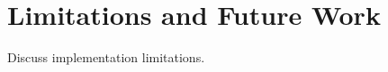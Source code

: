 \section{Limitations and Future Work}
\label{sec:limitations}

Discuss implementation limitations.

